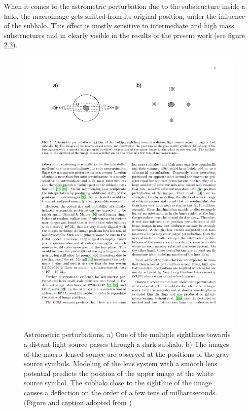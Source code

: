 \documentclass[paper=a4, fontsize=11pt]{scrartcl} %
\numberwithin{equation}{section} %
\numberwithin{figure}{section} %
\numberwithin{table}{section} %
\begin{document}
  When it comes to the astrometric perturbation due to the substructure inside a halo, the macroimage gets shifted from its original position, under the influence of the subhalo. This effect is mostly sensitive to intermediate and high mass substructures \citet{Moustakas+2009} and in clearly visible in the results of the present work (see figure \hyperref[fig:astrometric_perturbation]{2.3}).

 \begin{figure}
\label{fig:astrometric_perturbation}
\centering
\includegraphics[width=1.0\textwidth]{figs/astrometric_perturbation}
\caption {Astrometric perturbations. a) One of the multiple sightlines towards a distant light source passes through a dark subhalo. b) The images of the macro--lensed source are observed at the positions of the gray source symbols. Modeling of the lens system with a smooth lens potential predicts the position of the upper image at the white source symbol. The subhalo close to the sightline of the image causes a deflection on the order of a few tens of milliarcseconds. (Figure and caption adopted from \citet{Zackrisson.Riehm2010})}
 \end{figure}
 
\end{document}
